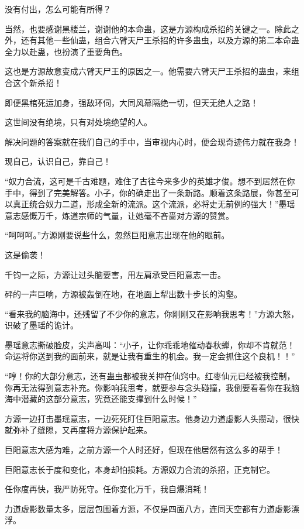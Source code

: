 \begin{this_body}
没有付出，怎么可能有所得？

当然，也要感谢黑楼兰，谢谢他的本命蛊，这是方源构成杀招的关键之一。除此之外，还有其他一些仙蛊，组合六臂天尸王杀招的许多蛊虫，以及方源的第二本命蛊全力以赴蛊，也扮演了重要角色。

这也是方源故意变成六臂天尸王的原因之一。他需要六臂天尸王杀招的蛊虫，来组合这个新杀招！

即便黑棺死运加身，强敌环伺，大同风幕隔绝一切，但天无绝人之路！

这世间没有绝境，只有对处境绝望的人。

解决问题的答案就在我们自己的手中，当审视内心时，便会现奇迹伟力就在我身！

现自己，认识自己，靠自己！

“奴力合流，这可是千古难题，难住了古往今来多少的英雄才俊。想不到居然在你手中，得到了完美解答。小子，你的确走出了一条新路。顺着这条路展，你甚至可以真正统合奴力二道，形成全新的流派。这个流派，必将史无前例的强大！”墨瑶意志感慨万千，炼道宗师的气量，让她毫不吝啬对方源的赞赏。

“呵呵呵。”方源刚要说些什么，忽然巨阳意志出现在他的眼前。

这是偷袭！

千钧一之际，方源让过头脑要害，用左肩承受巨阳意志一击。

砰的一声巨响，方源被轰倒在地，在地面上犁出数十步长的沟壑。

“看来我的脑海中，还残留了不少你的意志，你刚刚又在影响我思考！”方源大怒，识破了墨瑶的诡计。

墨瑶意志撕破脸皮，尖声高叫：“小子，让你乖乖地催动春秋蝉，你却不肯就范！命运将你送到我的面前来，就是让我有重生的机会。我一定会抓住这个良机！！”

“哼！你的大部分意志，还有蛊虫都被我关押在仙窍中。红枣仙元已经被我控制，你再无法得到意志补充。你影响我思考，就要参与念头碰撞，我倒要看看你在我脑海中潜藏的这部分意志，究竟还能支撑到什么时候！”

方源一边打击墨瑶意志，一边死死盯住巨阳意志。他身边力道虚影人头攒动，很快就弥补了缝隙，又再度将方源保护起来。

巨阳意志大感为难，之前方源一个人时还好，但现在他居然有这么多的帮手！

巨阳意志长于度和变化，本身却怕损耗。方源奴力合流的杀招，正克制它。

任你度再快，我严防死守。任你变化万千，我自爆消耗！

力道虚影数量太多，层层包围着方源，不仅是四面八方，连同天空都有力道虚影漂浮。


\end{this_body}
